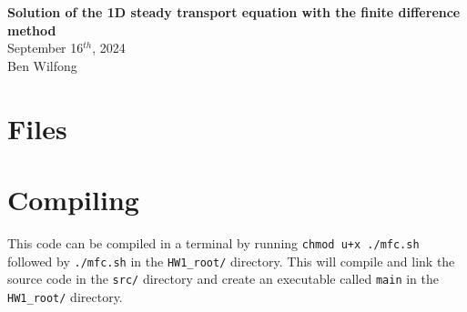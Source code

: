 \documentclass[reqno, 12pt]{article}
\def\name{Ben Wilfong} %
\def\ID{bwilfong3} %
\begin{document}
	\noindent
    \thispagestyle{firststyle}
    \begin{center}
        \LARGE{\textbf{Solution of the 1D steady transport equation with the finite difference method}} \\
        \Large{September 16$^{th}$, 2024} \\
        \large{Ben Wilfong}
    \end{center}
    \section*{Files}
    \section*{Compiling}
    This code can be compiled in a terminal by running \texttt{chmod u+x ./mfc.sh} followed by \texttt{./mfc.sh} in the \texttt{HW1\_root/} directory.
    This will compile and link the source code in the \texttt{src/} directory and create an executable called \texttt{main} in the \texttt{HW1\_root/} directory.
\end{document}
